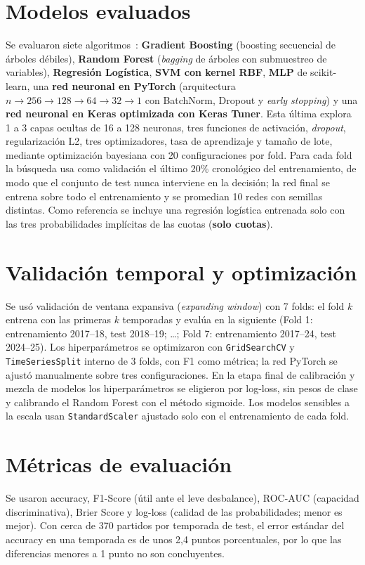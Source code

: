 \documentclass[12pt,letterpaper,oneside]{report}
\begin{document}
\section{Modelos evaluados}
Se evaluaron siete algoritmos~\cite{geron2022hands}: \textbf{Gradient Boosting} (boosting secuencial de árboles débiles), \textbf{Random Forest} (\textit{bagging} de árboles con submuestreo de variables), \textbf{Regresión Logística}, \textbf{SVM con kernel RBF}, \textbf{MLP} de scikit-learn, una \textbf{red neuronal en PyTorch} (arquitectura $n\!\rightarrow\!256\!\rightarrow\!128\!\rightarrow\!64\!\rightarrow\!32\!\rightarrow\!1$ con BatchNorm, Dropout y \textit{early stopping}) y una \textbf{red neuronal en Keras optimizada con Keras Tuner}. Esta última explora 1 a 3 capas ocultas de 16 a 128 neuronas, tres funciones de activación, \textit{dropout}, regularización L2, tres optimizadores, tasa de aprendizaje y tamaño de lote, mediante optimización bayesiana con 20 configuraciones por fold. Para cada fold la búsqueda usa como validación el último 20\% cronológico del entrenamiento, de modo que el conjunto de test nunca interviene en la decisión; la red final se entrena sobre todo el entrenamiento y se promedian 10 redes con semillas distintas. Como referencia se incluye una regresión logística entrenada solo con las tres probabilidades implícitas de las cuotas (\textbf{solo cuotas}).

\section{Validación temporal y optimización}
Se usó validación de ventana expansiva (\textit{expanding window}) con 7 folds: el fold $k$ entrena con las primeras $k$ temporadas y evalúa en la siguiente (Fold 1: entrenamiento 2017--18, test 2018--19; \dots; Fold 7: entrenamiento 2017--24, test 2024--25). Los hiperparámetros se optimizaron con \texttt{GridSearchCV} y \texttt{TimeSeriesSplit} interno de 3 folds, con F1 como métrica; la red PyTorch se ajustó manualmente sobre tres configuraciones. En la etapa final de calibración y mezcla de modelos los hiperparámetros se eligieron por log-loss, sin pesos de clase y calibrando el Random Forest con el método sigmoide. Los modelos sensibles a la escala usan \texttt{StandardScaler} ajustado solo con el entrenamiento de cada fold.

\section{Métricas de evaluación}
Se usaron accuracy, F1-Score (útil ante el leve desbalance), ROC-AUC (capacidad discriminativa), Brier Score y log-loss (calidad de las probabilidades; menor es mejor). Con cerca de 370 partidos por temporada de test, el error estándar del accuracy en una temporada es de unos 2,4 puntos porcentuales, por lo que las diferencias menores a 1 punto no son concluyentes.
\end{document}
